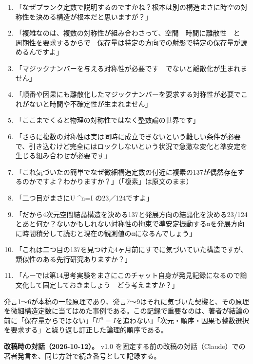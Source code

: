 \documentclass[
  a4paper,
]{ltjsarticle}
\providecommand{\tightlist}{%
  \setlength{\itemsep}{0pt}\setlength{\parskip}{0pt}}
\begin{document}
\begin{enumerate}
\def\labelenumi{\arabic{enumi}.}
\tightlist
\item
  「なぜプランク定数で説明するのですかね？根本は別の構造まさに時空の対称性を決める構造が根本だと思いますが？」
\item
  「複雑なのは、複数の対称性が組み合わさって、空間　時間に離散性　と　周期性を要求するからで　保存量は特定の方向での射影で特定の保存量が読めるんですよ」
\item
  「マジックナンバーを与える対称性が必要です　でないと離散化が生まれません」
\item
  「順番や因果にも離散化したマジックナンバーを要求する対称性が必要でこれがないと時間や不確定性が生まれません」
\item
  「ここまでくると物理の対称性ではなく整数論の世界です」
\item
  「さらに複数の対称性は実は同時に成立できないという難しい条件が必要で、引き込むけど完全にはロックしないという状況で急激な変化と準安定を生じる組み合わせが必要です」
\item
  「これ気づいたの簡単でなぜ微細構造定数の付近に複素の137が偶然存在するのかですよ？わかりますか？」（「複素」は原文のまま）
\item
  「二つ目がまさにU \^{}n=I の23／124ですよ」
\item
  「だから4次元空間結晶構造を決める137と発展方向の結晶化を決める23/124とあと何か？ないかもしれない対称性の拘束で準安定振動するαを発展方向に時間積分して読むと現在の観測値のαになるんでしょう」
\item
  「これは二つ目の137を見つけた4ヶ月前にすでに気づいていた構造ですが、類似性のある先行研究ありますか？」
\item
  「んーでは第14思考実験をまさにこのチャット自身が発見記録になるので論文化して固定しておきましょう　どう考えますか？」
\end{enumerate}

発言1〜6が本稿の一般原理であり、発言7〜9はそれに気づいた契機と、その原理を微細構造定数に当てはめた事例である。この記録で重要なのは、著者が結論の前に「保存量からではない」「\(U^n=I\)を追わない」「次元・順序・因果も整数選択を要求する」と繰り返し訂正した論理的順序である。

\textbf{改稿時の対話（2026-10-12）。} v1.0
を固定する前の改稿の対話（Claude）での著者発言を、同じ方針で続き番号として記録する。
\end{document}
